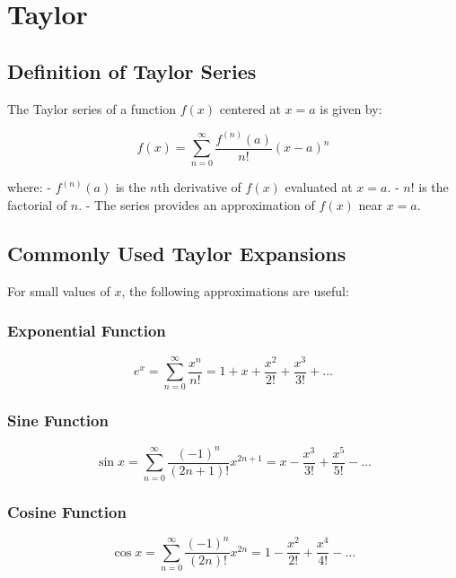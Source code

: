 \documentclass[../Main.tex]{subfiles}
\begin{document}
\section{Taylor}
\subsection{Definition of Taylor Series}

The Taylor series of a function $f(x)$ centered at $x = a$ is given by:

\begin{equation}
f(x) = \sum_{n=0}^{\infty} \frac{f^{(n)}(a)}{n!} (x - a)^n
\end{equation}

where:
- $f^{(n)}(a)$ is the $n$th derivative of $f(x)$ evaluated at $x = a$.
- $n!$ is the factorial of $n$.
- The series provides an approximation of $f(x)$ near $x = a$.

\subsection{Commonly Used Taylor Expansions}

For small values of $x$, the following approximations are useful:

\subsubsection{Exponential Function}
\begin{equation}
e^x = \sum_{n=0}^{\infty} \frac{x^n}{n!} = 1 + x + \frac{x^2}{2!} + \frac{x^3}{3!} + \dots
\end{equation}

\subsubsection{Sine Function}
\begin{equation}
\sin x = \sum_{n=0}^{\infty} \frac{(-1)^n}{(2n+1)!} x^{2n+1} = x - \frac{x^3}{3!} + \frac{x^5}{5!} - \dots
\end{equation}

\subsubsection{Cosine Function}
\begin{equation}
\cos x = \sum_{n=0}^{\infty} \frac{(-1)^n}{(2n)!} x^{2n} = 1 - \frac{x^2}{2!} + \frac{x^4}{4!} - \dots
\end{equation}
\end{document}
